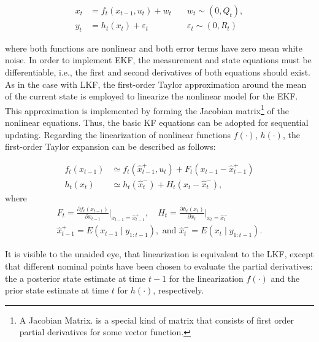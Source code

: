 \begin{equation*}
\begin{aligned}
x_t &= f_t(x_{t-1}, u_t) + w_t \quad &w_t \sim (0, Q_t), \\
y_t &= h_t(x_t) + \varepsilon_t \quad &\varepsilon_t \sim (0, R_t)
\end{aligned}
\end{equation*}

\noindent where both functions are nonlinear and both error terms have zero mean white noise. In order to implement EKF, the measurement and state equations must be differentiable, i.e., the first and second derivatives of both equations should exist. As in the case with LKF, the first-order Taylor approximation around the mean of the current state is employed to linearize the nonlinear model for the EKF. This approximation is implemented by forming the Jacobian matrix\footnote{A Jacobian Matrix. is a special kind of matrix that consists of first order partial derivatives for some vector function.} of the nonlinear equations. Thus, the basic KF equations can be adopted for sequential updating. Regarding the linearization of nonlinear functions \(f(\cdot)\), \(h(\cdot)\), the first-order Taylor expansion can be described as follows:

\begin{subequations}
\begin{align}
f_t\left(x_{t-1}\right) & \simeq f_t\left(\hat{x}_{t-1}^{+}, u_t\right) +
F_{t}\left(x_{t-1} - \hat{x}_{t-1}^+\right) \\
h_t\left(x_t\right) & \simeq h_t \left(\hat{x}_t^-\right) + H_t\left(x_t - \hat{x}_t^- \right),
\end{align}
\end{subequations}
\noindent where
\begin{subequations}
\begin{align}
F_t = \frac{\partial f_t(x_{t-1})}{\partial x_{t-1}}\bigg|_{x_{t-1}=\hat{x}_{t-1}^+}, \quad
H_t = \frac{\partial h_t(x_t)}{\partial x_t}\bigg|_{x_t=\hat{x}_t^{-}} \\
\hat{x}^{+}_{t-1}=E\left(x_{t-1} \mid y_{1: t-1}\right), \text { and } \hat{x}_t^{-}=E\left(x_t \mid y_{1: t-1}\right).
\end{align}
\end{subequations}

It is visible to the unaided eye, that linearization is equivalent to the LKF, except that different nominal points have been chosen to evaluate the partial derivatives: the a posterior state estimate at time \(t-1\) for the linearization \(f(\cdot)\) and the prior state estimate at time \(t\) for \(h(\cdot)\), respectively.

